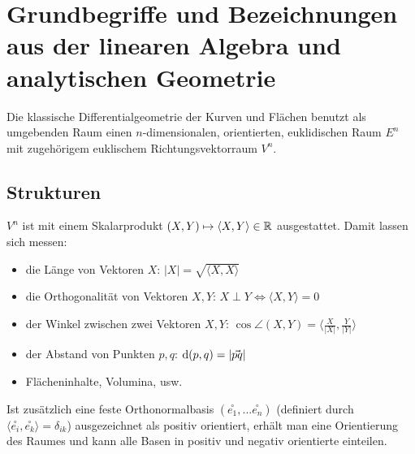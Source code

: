 \chapter{Grundbegriffe und Bezeichnungen aus der linearen Algebra und analytischen Geometrie}
  
  Die klassische Differentialgeometrie der Kurven und Flächen benutzt als umgebenden Raum einen \(n\)-dimensionalen, orientierten, euklidischen Raum \(E^n\) mit zugehörigem euklischem Richtungsvektorraum \(V^n\).

\section{Strukturen}

  \(V^n\) ist mit einem Skalarprodukt \((X,Y) \mapsto \langle X, Y \rangle \in \mathbb{R}\) ausgestattet. 
  Damit lassen sich messen:
  \begin{itemize}
   \item die Länge von Vektoren \(X\): \(|X| = \sqrt{ \langle X,X \rangle }\)
   \item die Orthogonalität von Vektoren \(X, Y\): \(X \perp Y \Leftrightarrow \langle X, Y \rangle = 0\)
   \item der Winkel zwischen zwei Vektoren \(X, Y\): \(\cos \angle (X, Y) = \langle \frac{X}{|X|}, \frac{Y}{|Y|} \rangle \)
   \item der Abstand von Punkten \(p, q\): \(\operatorname{d}(p,q) = | \vec{pq} | \)
   \item Flächeninhalte, Volumina, usw.
  \end{itemize}
  Ist zusätzlich eine feste Orthonormalbasis \( (\overset{\circ}{e_1}, ... \overset{\circ}{e_n}) \) (definiert durch \( \langle \overset{\circ}{e_i}, \overset{\circ}{e_k} \rangle = \delta_{ik} \)) ausgezeichnet als positiv orientiert, erhält man eine Orientierung des Raumes und kann alle Basen in positiv und negativ orientierte einteilen.
  
